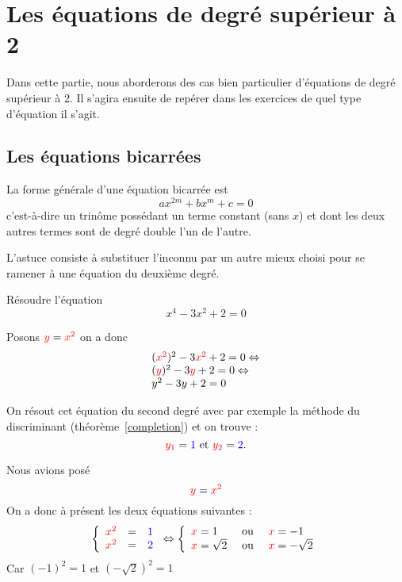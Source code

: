 \section{Les équations de degré supérieur à 2}

Dans cette partie, nous aborderons des cas bien particulier d'équations de degré supérieur à 2. Il s'agira ensuite de repérer dans les exercices de quel type d'équation il s'agit.

\subsection{Les équations bicarrées}

La forme générale d'une équation bicarrée est 
$$
ax^{2m}  + bx^{m} + c = 0
$$
c'est-à-dire un trinôme possédant un terme constant (sans $x$) et dont les deux autres termes sont de degré double l'un de l'autre.

L'astuce consiste à substituer l'inconnu par un autre mieux choisi pour se ramener à une équation du deuxième degré.

\begin{exemple}
Résoudre l'équation 
$$
x^4 -3x^2 + 2 = 0
$$

Posons $\textcolor{red}{y}=\textcolor{red}{x^2}$ on a donc
$$
\begin{array}{l}
(\textcolor{red}{x^2})^2 - 3\textcolor{red}{x^2} + 2 = 0 \Leftrightarrow \\
(\textcolor{red}{y})^2 - 3\textcolor{red}{y} + 2 = 0 \Leftrightarrow \\
y^2 -3y + 2 = 0
\end{array}
$$

On résout cet équation du second degré avec par exemple la méthode du discriminant (théorème~\ref{completion}) et on trouve :
$$
\textcolor{red}{y_1} = \textcolor{blue}{1} \mbox{ et } \textcolor{red}{y_2} = \textcolor{blue}{2}.
$$
\begin{center}
\end{center}
Nous avions posé
$$
\textcolor{red}{y} = \textcolor{red}{x^2}
$$
On a donc à présent les deux équations suivantes :
$$
\left\{
\begin{array}{lcl}
\textcolor{red}{x^2} &=& \textcolor{blue}{1}\\
\textcolor{red}{x^2} &=& \textcolor{blue}{2}
\end{array}
\right.
\Leftrightarrow 
\left\{
\begin{array}{lcl}
\textcolor{red}{x} = 1& \mbox{ ou }& \textcolor{red}{x} = -1\\
\textcolor{red}{x} = \sqrt{2}& \mbox{ ou }& \textcolor{red}{x} = -\sqrt{2}\\
\end{array}
\right.
$$
Car $(-1)^2 = 1$ et $(-\sqrt{2})^2 = 1$
\end{exemple}

